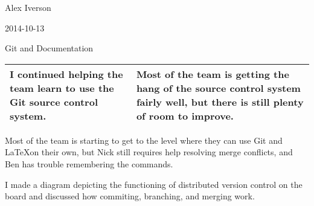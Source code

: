 Alex Iverson

2014-10-13

Git and Documentation

\begin{tabular}{|p{5cm}|p{5cm}|}
 \hline
 I continued helping the team learn to use the Git source control system.&
 Most of the team is getting the hang of the source control system fairly well, but there is still plenty of room to improve.\\
 \hline
\end{tabular}

\medskip 

Most of the team is starting to get to the level where they can use Git and \LaTeX on their own, but Nick still requires help resolving merge conflicts, and Ben has trouble remembering the commands.

I made a diagram depicting the functioning of distributed version control on the board and discussed how commiting, branching, and merging work.

